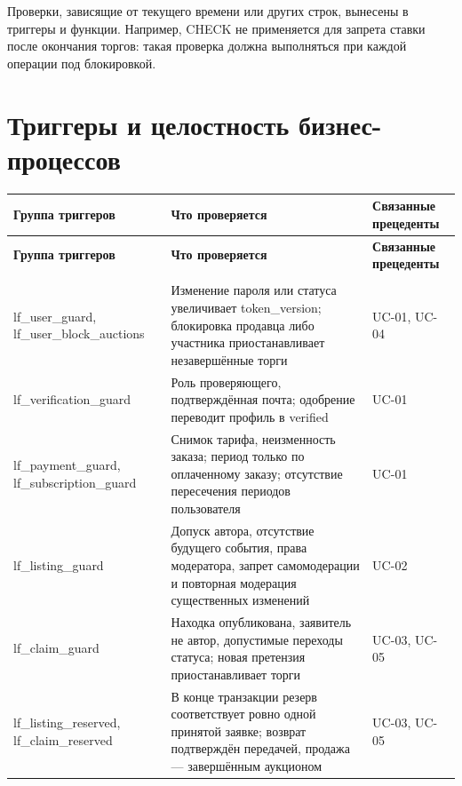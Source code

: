 Проверки, зависящие от текущего времени или других строк, вынесены в триггеры и функции. Например, CHECK не применяется для запрета ставки после окончания торгов: такая проверка должна выполняться при каждой операции под блокировкой.

\clearpage
\section{Триггеры и целостность бизнес-процессов}

\begingroup
{}
\fontsize{11}{13}\selectfont
\setlength{\tablecontentwidth}{\dimexpr\linewidth-6\tabcolsep-4\arrayrulewidth\relax}
\begin{longtable}{|>{\RaggedRight\arraybackslash}p{0.30\tablecontentwidth}|>{\RaggedRight\arraybackslash}p{0.35\tablecontentwidth}|>{\RaggedRight\arraybackslash}p{0.35\tablecontentwidth}|}
\hline
\textbf{Группа триггеров} & \textbf{Что проверяется} & \textbf{Связанные прецеденты} \\ \hline
\endfirsthead
\textbf{Группа триггеров} & \textbf{Что проверяется} & \textbf{Связанные прецеденты} \\ \hline
\endhead
\multicolumn{3}{r}{\footnotesize Продолжение на следующей странице} \\
\endfoot
\endlastfoot
lf\_\allowbreak{}user\_\allowbreak{}guard, lf\_\allowbreak{}user\_\allowbreak{}block\_\allowbreak{}auctions & Изменение пароля или статуса увеличивает token\_\allowbreak{}version; блокировка продавца либо участника приостанавливает незавершённые торги & UC-01, UC-04 \\ \hline
lf\_\allowbreak{}verification\_\allowbreak{}guard & Роль проверяющего, подтверждённая почта; одобрение переводит профиль в verified & UC-01 \\ \hline
lf\_\allowbreak{}payment\_\allowbreak{}guard, lf\_\allowbreak{}subscription\_\allowbreak{}guard & Снимок тарифа, неизменность заказа; период только по оплаченному заказу; отсутствие пересечения периодов пользователя & UC-01 \\ \hline
lf\_\allowbreak{}listing\_\allowbreak{}guard & Допуск автора, отсутствие будущего события, права модератора, запрет самомодерации и повторная модерация существенных изменений & UC-02 \\ \hline
lf\_\allowbreak{}claim\_\allowbreak{}guard & Находка опубликована, заявитель не автор, допустимые переходы статуса; новая претензия приостанавливает торги & UC-03, UC-05 \\ \hline
lf\_\allowbreak{}listing\_\allowbreak{}reserved, lf\_\allowbreak{}claim\_\allowbreak{}reserved & В конце транзакции резерв соответствует ровно одной принятой заявке; возврат подтверждён передачей, продажа — завершённым аукционом & UC-03, UC-05 \\ \hline

\end{longtable}
